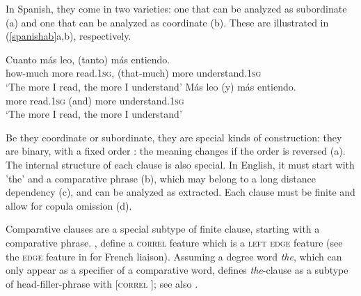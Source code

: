 \documentclass[output=paper]{langsci/langscibook}
\begin{document}
In Spanish, they come in two varieties: one that can be analyzed as subordinate (a) and one that can be analyzed as coordinate (b).
These are illustrated in (\ref{spanishab}a,b), respectively.


\begin{exe}
 \ex
\begin{xlista}
\ex \gll	Cuanto       m\'{a}s   leo,     (tanto)        m\'{a}s entiendo. \\
how-much more read.1\textsc{sg}, (that-much) more understand.1\textsc{sg} \\
\glt `The more I read, the more I understand'
\ex \gll	M\'{a}s leo        (y) m\'{a}s entiendo. \\
	more read.1\textsc{sg} (and) more understand.1\textsc{sg} \\
\glt `The more I read, the more I understand'\\
\citep{Abeille:Borsley:Espinal:06}
\end{xlista}\label{spanishab}
\end{exe}

Be they coordinate or subordinate, they are special kinds of construction: they are binary, with a fixed order : the meaning changes if the order is reversed (a).
The internal structure of each clause is also special. In English, it must start with 'the' and a comparative phrase (b), which may belong to a long distance dependency (c), and can be analyzed as extracted. Each clause must be finite and allow for copula omission (d).

\begin{exe}
 \ex
\begin{xlista}
\end{xlista}
\end{exe}

Comparative clauses are a special subtype of finite clause, starting with a comparative phrase. \citet{Abeille:Borsley:Espinal:06}, 
\citet{Borsley:11} 
define a \textsc{correl} feature which is a \textsc{left edge} feature (see the \textsc{edge} feature in \citet{Bonami:2004} for French liaison). Assuming a degree word \textit{the}, which can only appear as a specifier of a comparative word, \citet{Borsley:11}  defines \textit{the}-clause as a subtype of head-filler-phrase with [\textsc{correl} ]; see also \citet{fgsag08}.
\end{document}
